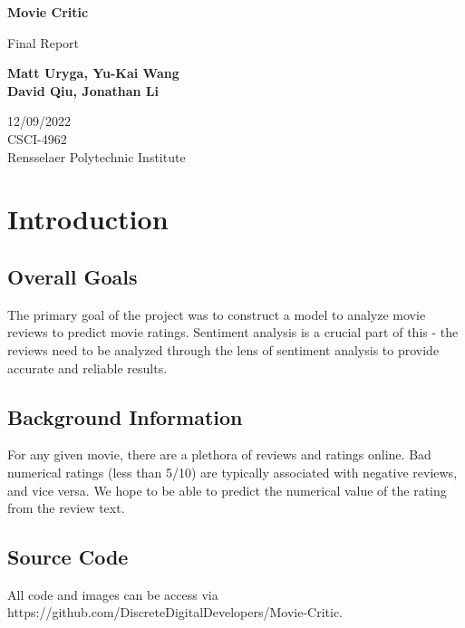 \documentclass[11pt]{article}
\newcommand{\np}{\newpage}
\begin{document}
\begin{titlepage}
\begin{center}
	\vspace*{1cm}

	\textbf{\Huge Movie Critic}

	\vspace{0.5cm}
	{\Large Final Report}

	\vspace{1.5cm}

	\textbf{Matt Uryga, Yu-Kai Wang\\David Qiu, Jonathan Li}

	\vfill

	12/09/2022\\
	CSCI-4962\\
	Rensselaer Polytechnic Institute
\end{center}
\end{titlepage}

\setcounter{secnumdepth}{4}
\setcounter{tocdepth}{4}

\tableofcontents
\np

\section{Introduction}
\subsection{Overall Goals}
The primary goal of the project was to construct a model to analyze movie reviews to predict movie ratings.  Sentiment analysis is a crucial part of this - the reviews need to be analyzed through the lens of sentiment analysis to provide accurate and reliable results.


\subsection{Background Information}
For any given movie, there are a plethora of reviews and ratings online.  Bad numerical ratings (less than 5/10) are typically associated with negative reviews, and vice versa.  We hope to be able to predict the numerical value of the rating from the review text.

\subsection{Source Code}
All code and images can be access via https://github.com/DiscreteDigitalDevelopers/Movie-Critic.
\end{document}

